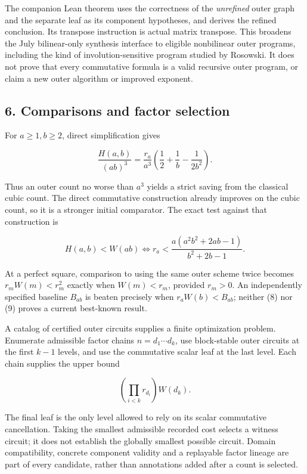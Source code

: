 \documentclass[
  11pt,
]{article}
\begin{document}
The companion Lean theorem uses the correctness of the \emph{unrefined}
outer graph and the separate leaf as its component hypotheses, and
derives the refined conclusion. Its transpose instruction is actual
matrix transpose. This broadens the July bilinear-only synthesis
interface to eligible nonbilinear outer programs, including the kind of
involution-sensitive program studied by Rosowski. It does not prove that
every commutative formula is a valid recursive outer program, or claim a
new outer algorithm or improved exponent.

\subsection{6. Comparisons and factor
selection}\label{comparisons-and-factor-selection}

For \(a\ge1,b\ge2\), direct simplification gives

\[
\frac{H(a,b)}{(ab)^3}
=\frac{r_a}{a^3}\left(\frac12+\frac1b-\frac1{2b^2}\right).
\tag{8}
\]

Thus an outer count no worse than \(a^3\) yields a strict saving from
the classical cubic count. The direct commutative construction already
improves on the cubic count, so it is a stronger initial comparator. The
exact test against that construction is

\[
H(a,b)<W(ab)
\iff
r_a<\frac{a(a^2b^2+2ab-1)}{b^2+2b-1}.
\tag{9}
\]

At a perfect square, comparison to using the same outer scheme twice
becomes \(r_mW(m)<r_m^2\) exactly when \(W(m)<r_m\), provided \(r_m>0\).
An independently specified baseline \(B_{ab}\) is beaten precisely when
\(r_aW(b)<B_{ab}\); neither (8) nor (9) proves a current best-known
result.

A catalog of certified outer circuits supplies a finite optimization
problem. Enumerate admissible factor chains \(n=d_1\cdots d_k\), use
block-stable outer circuits at the first \(k-1\) levels, and use the
commutative scalar leaf at the last level. Each chain supplies the upper
bound

\[
\left(\prod_{i<k}r_{d_i}\right)W(d_k).
\tag{10}
\]

The final leaf is the only level allowed to rely on its scalar
commutative cancellation. Taking the smallest admissible recorded cost
selects a witness circuit; it does not establish the globally smallest
possible circuit. Domain compatibility, concrete component validity and
a replayable factor lineage are part of every candidate, rather than
annotations added after a count is selected.
\end{document}
